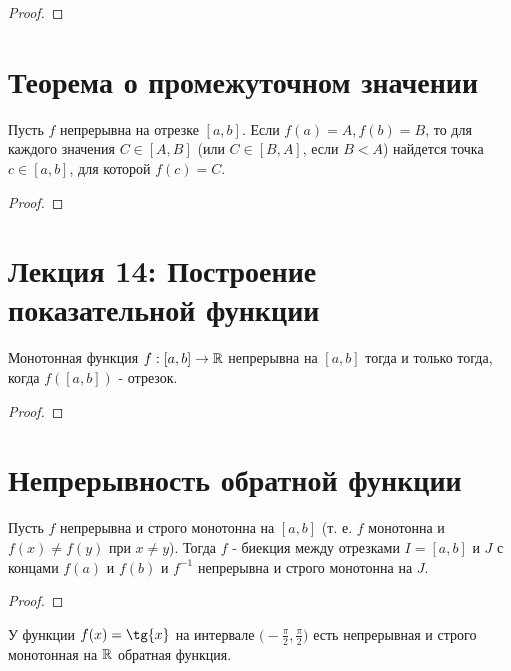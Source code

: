 	\begin{proof}
	\end{proof}
	
	\section{Теорема о промежуточном значении}
	
	\begin{theorem}[Коши]
		Пусть $f$ непрерывна на отрезке $[a, b]$. Если $f(a) = A, f(b) = B$, то для каждого значения $C \in [A, B]$ (или $C \in [B, A]$, если $B < A$) найдется точка $c \in [a, b]$, для которой $f(c) = C$.
	\end{theorem}
	
	\begin{proof}
	\end{proof}
	
	\section*{Лекция 14: Построение показательной функции}
	
	\begin{theorem}
		Монотонная функция $f : [a, b] \to \mathbb R$ непрерывна на $[a, b]$ тогда и только тогда, когда $f([a, b])$ - отрезок.
	\end{theorem}
	
	\begin{proof}
	\end{proof}
	
	\section{Непрерывность обратной функции}
	
	\begin{theorem}
		Пусть $f$ непрерывна и строго монотонна на $[a, b]$ (т. е. $f$ монотонна и $f(x) \neq f(y)$ при $x \neq y$). Тогда $f$ - биекция между отрезками $I = [a, b]$ и $J$ с концами $f(a)$ и $f(b)$ и $f^{-1}$ непрерывна и строго монотонна на $J$.
	\end{theorem}
	
	\begin{proof}
	\end{proof}
	
	\begin{example}
		У функции $f(x) = \tg{x}$ на интервале $\big(-\frac{\pi}{2}, \frac{\pi}{2})$ есть непрерывная и строго монотонная на $\mathbb R$ обратная функция.
	\end{example}
	
